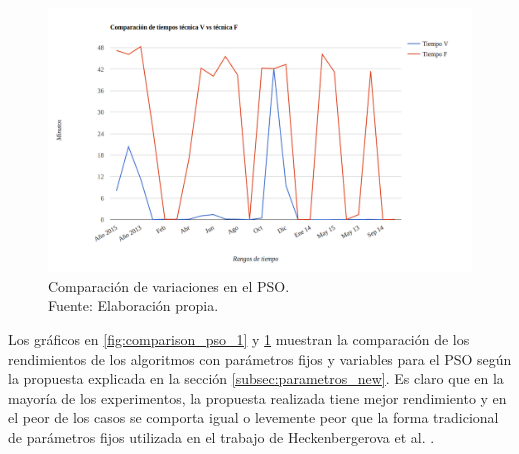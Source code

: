 \begin{figure}[ht!]
    \centering
    \captionsetup{justification=centering,margin=2cm}
        \includegraphics[width=\textwidth]{figures/comp_v1_v2_tiempo.png}   
    \caption{Comparación de variaciones en el PSO.\\ Fuente: Elaboración propia.}
    \label{fig:comparison_pso_2}
\end{figure}
Los gráficos en \ref{fig:comparison_pso_1} y  \ref{fig:comparison_pso_2} muestran la comparación de los rendimientos de los algoritmos con parámetros fijos y variables para el PSO según la propuesta explicada en la sección \ref{subsec:parametros_new}. Es claro que en la mayoría de los experimentos, la propuesta realizada tiene mejor rendimiento y en el peor de los casos se comporta igual o levemente peor que la forma tradicional de parámetros fijos utilizada en el trabajo de Heckenbergerova et al. \cite{Heckenbergerova15}.
\newpage
